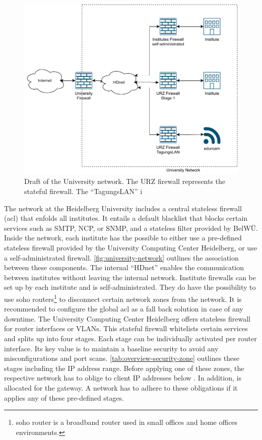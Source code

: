 \begin{figure}[ht]
    \centering
    \includegraphics[width=\textwidth]{figures/university-network.pdf}
    \caption[Draft of the University network]{Draft of the University network. The URZ firewall represents the stateful firewall. The \enquote{TagungsLAN} i}
    \label{fig:university-network}
\end{figure}

The network at the Heidelberg University includes a central stateless firewall (\ac{acl}) that enfolds all institutes.
It entails a default blacklist that blocks certain services such as SMTP, NCP, or SNMP, and a stateless filter provided by BelWÜ.
Inside the network, each institute has the possible to either use a pre-defined stateless firewall provided by the University Computing Center Heidelberg, or use a self-administrated firewall.
\autoref{fig:university-network} outlines the association between these components.
The internal \enquote{HDnet} enables the communication between institutes without leaving the internal network.
Institute firewalls can be set up by each institute and is self-administrated.
They do have the possibility to use \ac{soho} routers\footnote{\ac{soho} router is a broadband router used in small offices and home offices environments.} to disconnect certain network zones from the network.
It is recommended to configure the global \ac{acl} as a fall back solution in case of any downtime.
The University Computing Center Heidelberg offers stateless firewall for router interfaces or VLANs.
This stateful firewall whitelists certain services and splits up into four stages.
Each stage can be individually activated per router interface.
Its key value is to maintain a baseline security to avoid any misconfigurations and port scans.
\autoref{tab:overview-security-zone} outlines these stages including the IP address range.
Before applying one of these zones, the respective network has to oblige to client IP addresses below .
In addition,  is allocated for the gateway.
A network has to adhere to these obligations if it applies any of these pre-defined stages.

